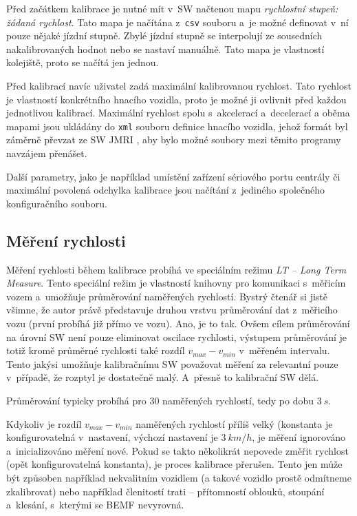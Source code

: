 Před začátkem kalibrace je nutné mít v~SW načtenou mapu \textit{rychlostní
stupeň: žádaná rychlost}. Tato mapa je načítána z~\texttt{csv} souboru a~je
možné definovat v~ní pouze nějaké jízdní stupně. Zbylé jízdní stupně se
interpolují ze sousedních nakalibrovaných hodnot nebo se nastaví manuálně.
Tato mapa je vlastností kolejiště, proto se načítá jen jednou.

Před kalibrací navíc uživatel zadá maximální kalibrovanou rychlost. Tato rychlost
je vlastností konkrétního hnacího vozidla, proto je možné ji ovlivnit před
každou jednotlivou kalibrací. Maximální rychlost spolu s~akcelerací a~decelerací
a oběma mapami jsou ukládány do \texttt{xml} souboru definice hnacího vozidla,
jehož formát byl záměrně převzat ze SW JMRI \cite{jmri:web}, aby bylo možné
soubory mezi těmito programy navzájem přenášet.

Další parametry, jako je například umístění zařízení sériového portu centrály
či maximální povolená odchylka kalibrace jsou načítání z~jediného společného
konfiguračního souboru.

\subsection{Měření rychlosti}
\label{sec:ac:lt-measure}

Měření rychlosti během kalibrace probíhá ve speciálním režimu \textit{LT --
Long Term Measure}. Tento speciální režim je vlastností knihovny pro komunikaci
s~měřicím vozem a~umožňuje průměrování naměřených rychlostí. Bystrý čtenář si
jistě všimne, že autor právě představuje druhou vrstvu průměrování dat
z~měřicího vozu (první probíhá již přímo ve vozu). Ano, je to tak. Ovšem cílem
průměrování na úrovní SW není pouze eliminovat oscilace rychlosti, výstupem
průměrování je totiž kromě průměrné rychlosti také rozdíl $v_{max} - v_{min}$
v~měřeném intervalu. Tento jakýsi  umožňuje kalibračnímu SW
považovat měření za relevantní pouze v~případě, že rozptyl je dostatečně malý.
A~přesně to kalibrační SW dělá.

Průměrování typicky probíhá pro $30$ naměřených rychlostí, tedy po dobu $3\ s$.

Kdykoliv je rozdíl $v_{max} - v_{min}$ naměřených rychlostí příliš velký
(konstanta je konfigurovatelná v~nastavení, výchozí nastavení je $3\ km/h$, je
měření ignorováno a~inicializováno měření nové. Pokud se takto několikrát
nepovede změřit rychlost (opět konfigurovatelná konstanta), je proces kalibrace
přerušen. Tento jen může být způsoben například nekvalitním vozidlem (a takové
vozidlo prostě odmítneme zkalibrovat) nebo například členitostí trati --
přítomností oblouků, stoupání a~klesání, s~kterými se BEMF nevyrovná.

